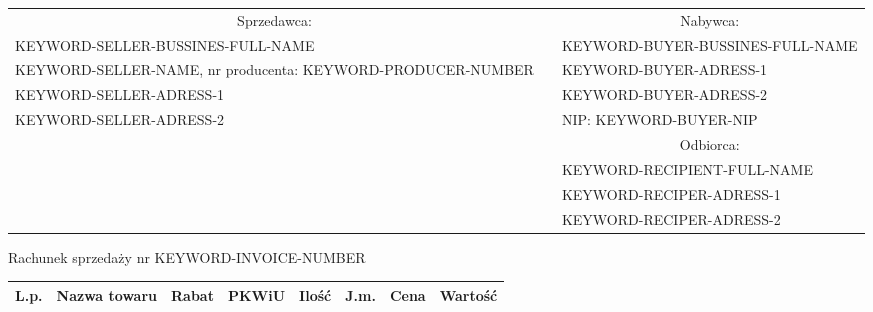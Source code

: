 \documentclass[a4paper]{book}
\begin{document}
\begin{table}[h]
\begin{tabularx}{\textwidth}{X c X}
\cline{1-1} \cline{3-3}
\multicolumn{1}{c}{\cellcolor[HTML]{C0C0C0}Sprzedawca:}                             &  & \multicolumn{1}{c}{\cellcolor[HTML]{C0C0C0}Nabywca:}     \\ \cline{1-1} \cline{3-3} 
\cellcolor[HTML]{FFFFFF}KEYWORD-SELLER-BUSSINES-FULL-NAME                           &  & \cellcolor[HTML]{FFFFFF}KEYWORD-BUYER-BUSSINES-FULL-NAME \\
\cellcolor[HTML]{FFFFFF}KEYWORD-SELLER-NAME, nr producenta: KEYWORD-PRODUCER-NUMBER &  & \cellcolor[HTML]{FFFFFF}KEYWORD-BUYER-ADRESS-1           \\
\cellcolor[HTML]{FFFFFF}KEYWORD-SELLER-ADRESS-1                                     &  & \cellcolor[HTML]{FFFFFF}KEYWORD-BUYER-ADRESS-2           \\
\cellcolor[HTML]{FFFFFF}KEYWORD-SELLER-ADRESS-2 					&  & \cellcolor[HTML]{FFFFFF}NIP: KEYWORD-BUYER-NIP           \\ \cline{1-1} \cline{3-3} 
                                                                                    &  & \multicolumn{1}{c}{\cellcolor[HTML]{C0C0C0}Odbiorca:}    \\
                                                                                    &  & KEYWORD-RECIPIENT-FULL-NAME                              \\
                                                                                    &  & KEYWORD-RECIPER-ADRESS-1                                 \\
                                                                                    &  & KEYWORD-RECIPER-ADRESS-2                                 \\ \cline{3-3} 
\end{tabularx}
\end{table}


\vspace{0.3cm}
\centering
\begin{Huge}
 Rachunek sprzedaży nr KEYWORD-INVOICE-NUMBER
\end{Huge}


\begin{table}[H]
\centering
\begin{tabularx}{\textwidth}{|l|X|l|l|l|l|l|l|}
\hline
\rowcolor[HTML]{C0C0C0} 
\textbf{L.p.} & \centering\textbf{Nazwa towaru} & \textbf{Rabat} & \textbf{PKWiU} & \textbf{Ilość} & \textbf{J.m.} & \textbf{Cena} & \textbf{Wartość} \\ \hline

\end{tabularx}
\end{table}
\end{document}
